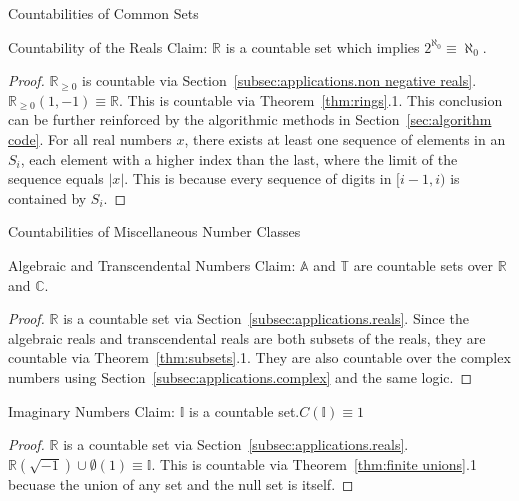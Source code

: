 \documentclass[12pt]{article}
\begin{document}
\begin{section}{Countabilities of Common Sets}
	\begin{subsection}{Countability of the Reals}\label{subsec:applications.reals}
		Claim: $\mathbb R$ is a countable set which implies $2^{\aleph_0}\equiv\aleph_0$.
		\begin{proof}
			$\mathbb R_{\geqslant0}$ is countable via Section~\ref{subsec:applications.non negative reals}.
			$\mathbb R_{\geqslant0}(1, -1)\equiv\mathbb R$. This is countable via
			Theorem~\ref{thm:rings}.1. This conclusion can be further reinforced by
			the algorithmic methods in Section~\ref{sec:algorithm code}. For all real
			numbers $x$, there exists at least one sequence of elements in an $S_i$,
			each element with a higher index than the last, where the limit of the sequence
			equals $|x|$. This is because every sequence of digits in $[i-1,i)$ is contained by $S_i$.
		\end{proof}
	\end{subsection}

	\begin{subsection}{Countabilities of Miscellaneous Number Classes}
	\label{subsec:applications.miscellaneous}
		\begin{subsubsection}{Algebraic and Transcendental Numbers}
			\label{subsubsec:applications.misc.reals}
			Claim: $\mathbb A$ and $\mathbb T$ are countable sets over $\mathbb R$ and $\mathbb C$.
			\begin{proof}
				$\mathbb R$ is a countable set via Section~\ref{subsec:applications.reals}.
				Since the algebraic reals and transcendental reals are both subsets of the
				reals, they are countable via Theorem~\ref{thm:subsets}.1. They are also
				countable over the complex numbers using Section~\ref{subsec:applications.complex}
				and the same logic.
			\end{proof}
		\end{subsubsection}

		\begin{subsubsection}{Imaginary Numbers}\label{subsubsec:applications.misc.imaginary}
			Claim: $\mathbb I$ is a countable set.\hspace{2em}$C(\mathbb I)\equiv1$
			\begin{proof}
				$\mathbb R$ is a countable set via Section~\ref{subsec:applications.reals}.
				$\mathbb R(\sqrt{-1})\cup\emptyset(1)\equiv\mathbb I$. This is countable via
				Theorem~\ref{thm:finite unions}.1 becuase the union of any set and the null set
				is itself.
			\end{proof}
		\end{subsubsection}
	\end{subsection}


\end{section}
\end{document}
